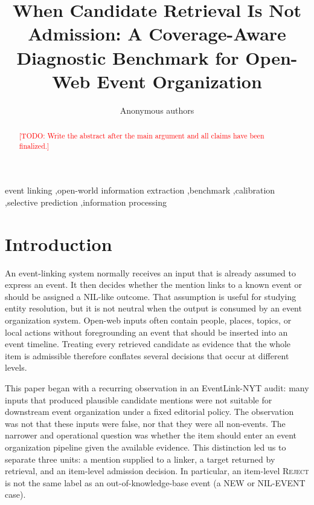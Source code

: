 \documentclass[5p,times]{elsarticle}
\newcommand{\reject}{\mbox{\textsc{Reject}}}
\newcommand{\todo}[1]{\textcolor{red}{[TODO: #1]}}
\begin{document}
\begin{frontmatter}

\title{When Candidate Retrieval Is Not Admission: A Coverage-Aware Diagnostic Benchmark for Open-Web Event Organization}

\author[inst1]{Anonymous authors}
\address[inst1]{Under double-blind review}

\begin{abstract}
\todo{Write the abstract after the main argument and all claims have been finalized.}
\end{abstract}

\begin{keyword}
event linking \sep open-world information extraction \sep benchmark \sep calibration \sep selective prediction \sep information processing
\end{keyword}

\end{frontmatter}

\section{Introduction}
\label{sec:intro}

An event-linking system normally receives an input that is already assumed to express an event. It then decides whether the mention links to a known event or should be assigned a NIL-like outcome. That assumption is useful for studying entity resolution, but it is not neutral when the output is consumed by an event organization system. Open-web inputs often contain people, places, topics, or local actions without foregrounding an event that should be inserted into an event timeline. Treating every retrieved candidate as evidence that the whole item is admissible therefore conflates several decisions that occur at different levels.

This paper began with a recurring observation in an EventLink-NYT audit: many inputs that produced plausible candidate mentions were not suitable for downstream event organization under a fixed editorial policy. The observation was not that these inputs were false, nor that they were all non-events. The narrower and operational question was whether the item should enter an event organization pipeline given the available evidence. This distinction led us to separate three units: a mention supplied to a linker, a target returned by retrieval, and an item-level admission decision. In particular, an item-level \reject{} is not the same label as an out-of-knowledge-base event (a NEW or NIL-EVENT case).
\end{document}
